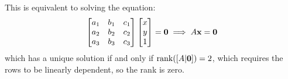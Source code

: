 \begin{sol}
    This is equivalent to solving the equation:
    \begin{equation}
        \begin{bmatrix}
            a_1 & b_1 & c_1 \\ 
            a_2 & b_2 & c_2 \\ 
            a_3 & b_3 & c_3 
        \end{bmatrix}
        \begin{bmatrix}
            x \\ y \\ 1
        \end{bmatrix}
        =\mathbf{0} \implies A\mathbf{x}=\mathbf{0}
    \end{equation}
    which has a unique solution if and only if $\rank([A|\mathbf{0}])=2$, which requires the rows to be linearly dependent, so the rank is zero.
\end{sol}